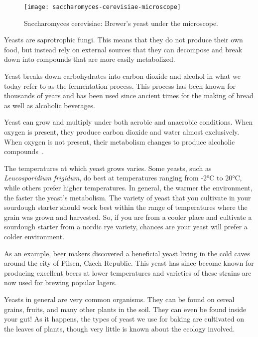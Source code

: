 \begin{figure}[!htb]
\begin{center}
  \texttt{[image: saccharomyces-cerevisiae-microscope]}
  \caption{Saccharomyces cerevisiae: Brewer's yeast under the microscope.}%
  \label{saccharomyces-cerevisiae-microscope}
\end{center}
\end{figure}

Yeasts are saprotrophic fungi. This means that they do not produce their own
food, but instead rely on external sources that they can decompose and break
down into compounds that are more easily metabolized.

Yeast breaks down carbohydrates into carbon dioxide and alcohol in what we today
refer to as the fermentation process. This process has been known for thousands
of years and has been used since ancient times for the making of bread as well
as alcoholic beverages.

Yeast can grow and multiply under both aerobic and anaerobic conditions. When
oxygen is present, they produce carbon dioxide and water almost exclusively.
When oxygen is not present, their metabolism changes to produce alcoholic
compounds~\cite{effects+oxygen+yeast+growth}.

The temperatures at which yeast grows varies. Some yeasts, such as
\emph{Leucosporidium frigidum}, do best at temperatures ranging from -2°C to
20°C, while others prefer higher temperatures. In general, the warmer the
environment, the faster the yeast's metabolism. The variety of yeast
that you cultivate in your sourdough starter should work best within the range
of temperatures where the grain was grown and harvested. So, if you are from a
cooler place and cultivate a sourdough starter from a nordic rye variety,
chances are your yeast will prefer a colder environment.

As an example, beer makers discovered a beneficial yeast living in the cold
caves around the city of Pilsen, Czech Republic. This yeast has since become
known for producing excellent beers at lower temperatures and varieties of
these strains are now used for brewing popular lagers.

Yeasts in general are very common organisms. They can be found on cereal
grains, fruits, and many other plants in the soil. They can even be found
inside your gut! As it happens, the types of yeast we use for baking are
cultivated on the leaves of plants, though very little is known about the
ecology involved.


